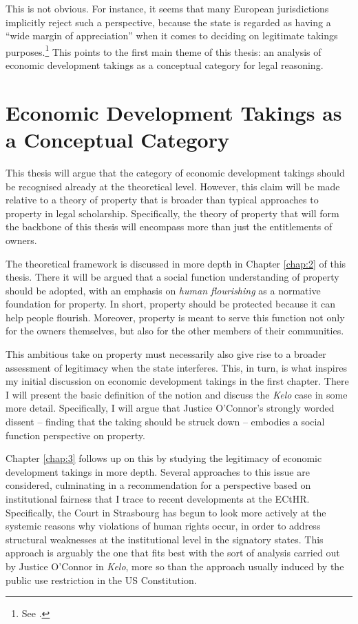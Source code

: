 This is not obvious. For instance, it seems that many European jurisdictions implicitly reject such a perspective, because the state is regarded as having a ``wide margin of appreciation'' when it comes to deciding on legitimate takings purposes.\footnote{See \cite{james86}.} This points to the first main theme of this thesis: an analysis of economic development takings as a conceptual category for legal reasoning.

\section{Economic Development Takings as a Conceptual Category}\label{sec:1:1}

This thesis will argue that the category of economic development takings should be recognised already at the theoretical level. However, this claim will be made relative to a theory of property that is broader than typical approaches to property in legal scholarship. Specifically, the theory of property that will form the backbone of this thesis will encompass more than just the entitlements of owners. 

The theoretical framework is discussed in more depth in Chapter \ref{chap:2} of this thesis. There it will be argued that a social function understanding of property should be adopted, with an emphasis on {\it human flourishing} as a normative foundation for property. In short, property should be protected because it can help people flourish. Moreover, property is meant to serve this function not only for the owners themselves, but also for the other members of their communities.

This ambitious take on property must necessarily also give rise to a broader assessment of legitimacy when the state interferes. This, in turn, is what inspires my initial discussion on economic development takings in the first chapter. There I will present the basic definition of the notion and discuss the {\it Kelo} case in some more detail. Specifically, I will argue that Justice O'Connor's strongly worded dissent -- finding that the taking should be struck down -- embodies a social function perspective on property.

Chapter \ref{chap:3} follows up on this by studying the legitimacy of economic development takings in more depth. Several approaches to this issue are considered, culminating in a recommendation for a perspective based on institutional fairness that I trace to recent developments at the ECtHR. Specifically, the Court in Strasbourg has begun to look more actively at the systemic reasons why violations of human rights occur, in order to address structural weaknesses at the institutional level in the signatory states. This approach is arguably the one that fits best with the sort of analysis carried out by Justice O'Connor in {\it Kelo}, more so than the approach usually induced by the public use restriction in the US Constitution.

